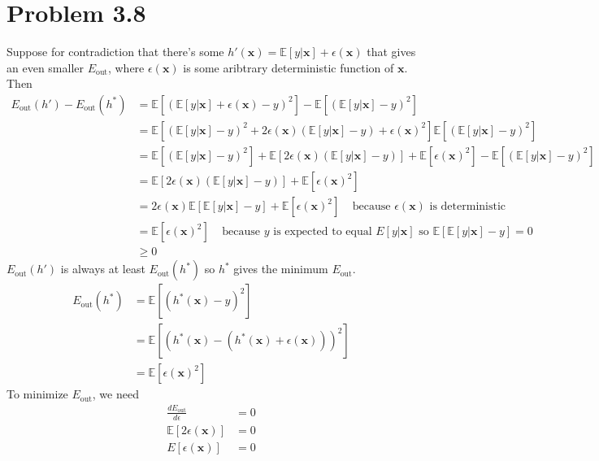\documentclass{article}
\begin{document}
	\section*{Problem 3.8}
		Suppose for contradiction that there's some $h'(\mathbf x) = \mathbb E[y | \mathbf x] + \epsilon(\mathbf x)$ that gives an even smaller $E_\text{out}$, where $\epsilon(\mathbf x)$ is some aribtrary deterministic function of $\mathbf x$.\\
		Then
		\begin{align*}
			E_\text{out}(h') - E_\text{out}(h^*) &= \mathbb E[ (\mathbb E[y | \mathbf x] + \epsilon(\mathbf x) - y)^2] - \mathbb E[ (\mathbb E[y | \mathbf x] - y)^2]\\
			&= \mathbb E[(\mathbb E[y|\mathbf x] - y)^2 + 2\epsilon(\mathbf x)(\mathbb E[y|\mathbf x] - y) + \epsilon(\mathbf x)^2]  \mathbb E[ (\mathbb E[y | \mathbf x] - y)^2]\\
			&= \mathbb E[(\mathbb E[y|\mathbf x] - y)^2] + \mathbb E[2\epsilon(\mathbf x)(\mathbb E[y|\mathbf x] - y)] + \mathbb E[\epsilon(\mathbf x)^2] - \mathbb E[ (\mathbb E[y | \mathbf x] - y)^2]\\
			&= \mathbb E[2\epsilon(\mathbf x)(\mathbb E[y|\mathbf x] - y)] + \mathbb E[\epsilon(\mathbf x)^2]\\
			&= 2\epsilon(\mathbf x)\mathbb E[\mathbb E[y|\mathbf x] - y] + \mathbb E[\epsilon(\mathbf x)^2]\ \ \ \ \ \text{because }\epsilon(\mathbf x)\text{ is deterministic}\\
			&= \mathbb E[\epsilon(\mathbf x)^2]\ \ \ \ \ \text{because } y \text{ is expected to equal }E[y | \mathbf x] \text{ so } \mathbb E[\mathbb E[y|\mathbf x] - y] = 0\\
			&\geq 0
		\end{align*}
		$E_\text{out}(h')$ is always at least $E_\text{out}(h^*)$ so $h^*$ gives the minimum $E_\text{out}$.
		\begin{align*}
			E_\text{out}(h^*) &= \mathbb E[(h^*(\mathbf x) - y)^2]\\
			&= \mathbb E[(h^*(\mathbf x) - (h^*(\mathbf x) + \epsilon(\mathbf x)))^2]\\
			&= \mathbb E[\epsilon(\mathbf x)^2]
		\end{align*}
		To minimize $E_\text{out}$, we need
		\begin{align*}
			\frac{dE_\text{out}}{d\epsilon} &= 0\\
			\mathbb E[2\epsilon(\mathbf x)] &= 0\\
			E[\epsilon(\mathbf x)] &= 0
		\end{align*}
\end{document}
